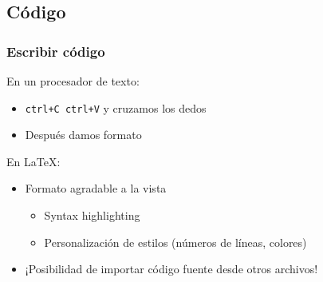 \documentclass[svgnames]{beamer}
\begin{document}

\subsection{Código}

\begin{frame}
  \frametitle{Escribir código}
  En un procesador de texto: 
  \begin{itemize}
    \item \texttt{ctrl+C ctrl+V} y cruzamos los dedos
    \item Después damos formato
  \end{itemize}\pause
  En \LaTeX:
  \begin{itemize}
    \item Formato agradable a la vista
    \begin{itemize}
      \item Syntax highlighting
      \item Personalización de estilos (números de líneas, colores)
    \end{itemize}
    \item ¡Posibilidad de importar código fuente desde otros archivos!
  \end{itemize}
\end{frame}
\end{document}
